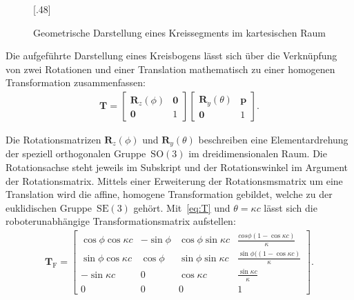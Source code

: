 \begin{figure}[hbt!]
\centering
{}[.48\linewidth]
{}
\label{fig:bogengeometrie}
{}
\caption[Geometrische Darstellung eines Kreissegments im kartesischen Raum]{Geometrische Darstellung eines Kreissegments im kartesischen Raum}
\label{fig:bogenparameter}
\end{figure}

Die aufgeführte Darstellung eines Kreisbogens lässt sich über die Verknüpfung von zwei Rotationen und einer Translation mathematisch zu einer homogenen Transformation zusammenfassen:
\begin{align}
\bm{T} = 
\begin{bmatrix}
\bm{R}_z(\phi) & \bm{0} \\
\bm{0} & 1
\end{bmatrix}
\begin{bmatrix}
\bm{R}_y(\theta) & \bm{p} \\
\bm{0} & 1
\end{bmatrix}.
\label{eq:T}
\end{align}

Die Rotationsmatrizen $\bm{R}_z(\phi)$ und $\bm{R}_y(\theta)$ beschreiben eine Elementardrehung der speziell orthogonalen Gruppe~$\mathrm{SO}(3)$ im dreidimensionalen Raum. Die Rotationsachse steht jeweils im Subskript und der Rotationswinkel im Argument der Rotationsmatrix. Mittels einer Erweiterung der Rotationsmsmatrix um eine Translation wird die affine, homogene Transformation gebildet, welche zu der euklidischen Gruppe~$\mathrm{SE}(3)$ gehört. Mit~\eqref{eq:T} und $\theta=\kappa c$ lässt sich die roboterunabhängige Transformationsmatrix aufstellen:
\begin{align}
\bm{T}_\mathrm{F} = 
\begin{bmatrix}
\cos\phi \cos\kappa c & -\sin\phi & \cos\phi \sin\kappa c & \frac{cos\phi (1-\cos\kappa c)}{\kappa} \\
\sin\phi \cos\kappa c & \cos\phi & \sin\phi \sin\kappa c & \frac{\sin\phi( (1-\cos\kappa c)}{\kappa} \\
-\sin\kappa c &  0 & \cos\kappa c & \frac{\sin\kappa c}{\kappa} \\
0 & 0 & 0 & 1
\end{bmatrix}.
\label{eq:T_frenet}
\end{align}

